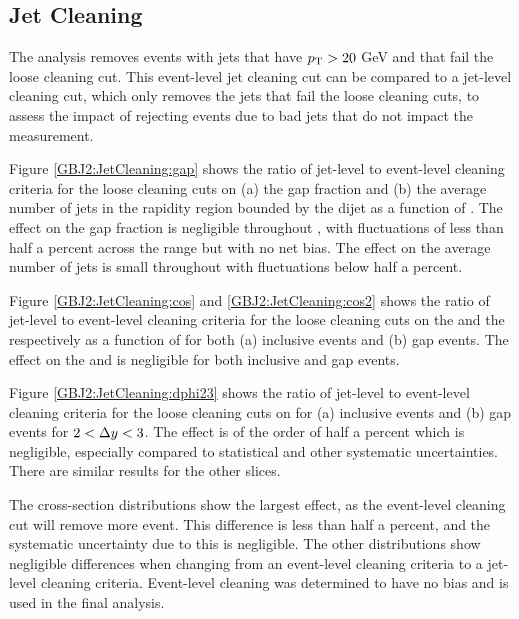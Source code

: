 \subsection{Jet Cleaning}
\label{sec:GBJ2:Cleaning}

The analysis removes events with jets that have $\mbox{$p_{\rm T}$}{}>20$ GeV  and that fail the loose cleaning cut.
This event-level jet cleaning cut can be compared to a jet-level cleaning cut, which only removes the jets that fail the loose cleaning cuts, to assess the impact of rejecting events due to bad jets that do not impact the measurement.



Figure \ref{GBJ2:JetCleaning:gap} shows the ratio of jet-level to event-level cleaning criteria for the loose cleaning cuts on (a) the gap fraction and (b) the average number of jets in the rapidity region bounded by the dijet as a function of \dy{}.
The effect on the gap fraction is negligible throughout \dy{}, with fluctuations of less than half a percent across the \dy{} range but with no net bias.
The effect on the average number of jets is small throughout \dy{} with fluctuations below half a percent.

Figure \ref{GBJ2:JetCleaning:cos} and \ref{GBJ2:JetCleaning:cos2} shows the ratio of jet-level to event-level cleaning criteria for the loose cleaning cuts  on the \mean{\cosdphi{}} and the \mean{\costwodphi{}} respectively as a function of \dy{} for both (a) inclusive events and (b) gap events.
The effect on the \mean{\cosdphi{}} and \mean{\costwodphi{}} is negligible for both inclusive and gap events.

Figure \ref{GBJ2:JetCleaning:dphi23} shows the ratio of jet-level to event-level cleaning criteria for the loose cleaning cuts on \dphiDist{} for (a) inclusive events and (b) gap events for $2<\mbox{$\Delta y$}{}<3$. 
The effect is of the order of half a percent which is negligible, especially compared to statistical and other systematic uncertainties.
There are similar results for the other \dy{} slices.

The cross-section distributions show the largest effect, as the event-level cleaning cut will remove more event. 
This difference is less than half a percent, and the systematic uncertainty due to this is negligible.
The other distributions show negligible differences when changing from an event-level cleaning criteria to a jet-level cleaning criteria. 
Event-level cleaning was determined to have no bias and is used in the final analysis. 





